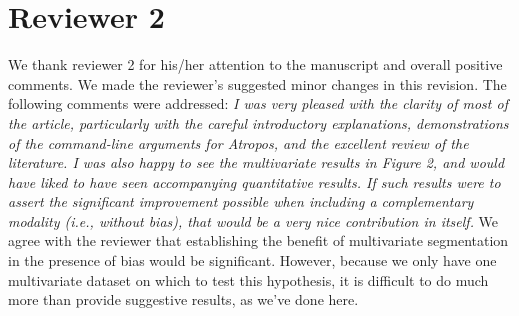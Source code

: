 \documentclass[11pt]{article}
\begin{document}
\section{Reviewer 2}
We thank reviewer 2 for his/her attention to the manuscript and overall 
positive comments.  We made the reviewer's suggested minor changes in this revision.  
The following comments were addressed: 
\newline
\newline
{\em I was very pleased with the clarity of most of the article,
 particularly with the careful introductory explanations,
 demonstrations of the command-line arguments for Atropos, and the
 excellent review of the literature. I was also happy to see the
 multivariate results in Figure 2, and would have liked to have seen
 accompanying quantitative results. If such results were to assert the
 significant improvement possible when including a complementary
 modality (i.e., without bias), that would be a very nice contribution
 in itself.}
\newline
\newline
We agree with the reviewer that establishing the benefit of
multivariate segmentation in the presence of bias would be
significant.  However, because we only have one multivariate dataset
on which to test this hypothesis, it is difficult to do much more than
provide suggestive results, as we've done here.
\newline
\newline
\end{document}
